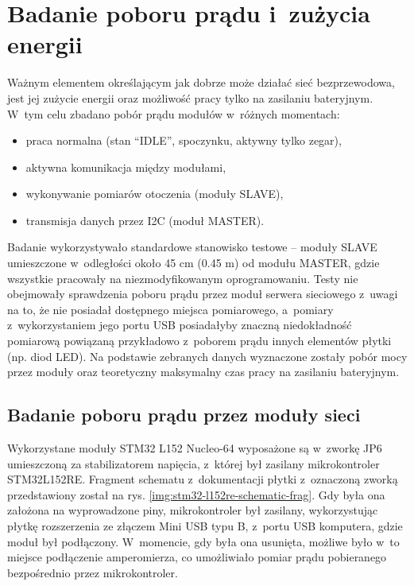 \FloatBarrier
\section{\label{sect:network-power-params}Badanie poboru prądu i~zużycia energii} Ważnym elementem określającym jak
dobrze może działać sieć bezprzewodowa, jest jej zużycie energii oraz możliwość pracy tylko na zasilaniu bateryjnym.
W~tym celu zbadano pobór prądu modułów w~różnych momentach:
\begin{itemize}[label=--]
    \item praca normalna (stan \enquote{IDLE}, spoczynku, aktywny tylko zegar),
    \item aktywna komunikacja między modułami,
    \item wykonywanie pomiarów otoczenia (moduły SLAVE),
    \item transmisja danych przez I2C (moduł MASTER).
\end{itemize}

Badanie wykorzystywało standardowe stanowisko testowe -- moduły SLAVE umieszczone w~odległości około 45 cm (0.45 m) od
modułu MASTER, gdzie wszystkie pracowały na niezmodyfikowanym oprogramowaniu. Testy nie obejmowały sprawdzenia poboru
prądu przez moduł serwera sieciowego z~uwagi na to, że nie posiadał dostępnego miejsca pomiarowego, a~pomiary
z~wykorzystaniem jego portu USB posiadałyby znaczną niedokładność pomiarową powiązaną przykładowo z~poborem prądu innych
elementów płytki (np. diod LED). Na podstawie zebranych danych wyznaczone zostały pobór mocy przez moduły oraz
teoretyczny maksymalny czas pracy na zasilaniu bateryjnym.

\subsection{\label{sect:network-modules-current-draw}Badanie poboru prądu przez moduły sieci} Wykorzystane moduły STM32
L152 Nucleo-64 wyposażone są w~zworkę JP6 umieszczoną za stabilizatorem napięcia, z~której był zasilany mikrokontroler
STM32L152RE. Fragment schematu z~dokumentacji płytki \cite{stm-product-overview} z~oznaczoną zworką przedstawiony został
na rys. \ref{img:stm32-l152re-schematic-frag}. Gdy była ona założona na wyprowadzone piny, mikrokontroler był zasilany,
wykorzystując płytkę rozszerzenia ze złączem Mini USB typu B, z~portu USB komputera, gdzie moduł był podłączony.
W~momencie, gdy była ona usunięta, możliwe było w~to miejsce podłączenie amperomierza, co umożliwiało pomiar prądu
pobieranego bezpośrednio przez mikrokontroler.

